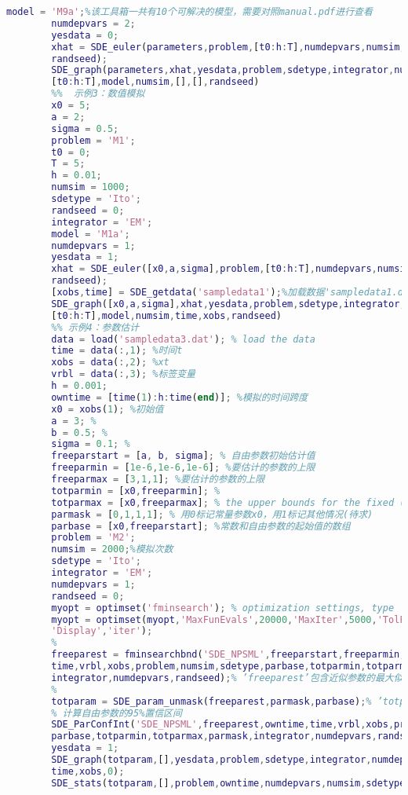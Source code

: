 \begin{lstlisting}[language= Matlab]
        model = 'M9a';%该工具箱一共有10个可解决的模型，需要对照manual.pdf进行查看
        numdepvars = 2;
        yesdata = 0;
        xhat = SDE_euler(parameters,problem,[t0:h:T],numdepvars,numsim,sdetype,...
        randseed);
        SDE_graph(parameters,xhat,yesdata,problem,sdetype,integrator,numdepvars,...
        [t0:h:T],model,numsim,[],[],randseed)
        %%  示例3：数值模拟
        x0 = 5;
        a = 2;
        sigma = 0.5;
        problem = 'M1';
        t0 = 0;
        T = 5;
        h = 0.01;
        numsim = 1000;
        sdetype = 'Ito';
        randseed = 0;
        integrator = 'EM';
        model = 'M1a';
        numdepvars = 1;
        yesdata = 1;
        xhat = SDE_euler([x0,a,sigma],problem,[t0:h:T],numdepvars,numsim,sdetype,...
        randseed);
        [xobs,time] = SDE_getdata('sampledata1');%加载数据'sampledata1.dat'
        SDE_graph([x0,a,sigma],xhat,yesdata,problem,sdetype,integrator,numdepvars,...
        [t0:h:T],model,numsim,time,xobs,randseed)
        %% 示例4：参数估计
        data = load('sampledata3.dat'); % load the data
        time = data(:,1); %时间t
        xobs = data(:,2); %xt
        vrbl = data(:,3); %标签变量
        h = 0.001;
        owntime = [time(1):h:time(end)]; %模拟的时间跨度
        x0 = xobs(1); %初始值
        a = 3; %
        b = 0.5; %
        sigma = 0.1; %
        freeparstart = [a, b, sigma]; % 自由参数初始估计值
        freeparmin = [1e-6,1e-6,1e-6]; %要估计的参数的上限
        freeparmax = [3,1,1]; %要估计的参数的上限
        totparmin = [x0,freeparmin]; %
        totparmax = [x0,freeparmax]; % the upper bounds for the fixed (x0) and the free to vary parameters
        parmask = [0,1,1,1]; % 用0标记常量参数x0，用1标记其他情况(待求)
        parbase = [x0,freeparstart]; %常数和自由参数的起始值的数组
        problem = 'M2';
        numsim = 2000;%模拟次数
        sdetype = 'Ito';
        integrator = 'EM';
        numdepvars = 1;
        randseed = 0;
        myopt = optimset('fminsearch'); % optimization settings, type ’help optimset’ for details
        myopt = optimset(myopt,'MaxFunEvals',20000,'MaxIter',5000,'TolFun',1.e-4,'TolX',1.e-4,...
        'Display','iter');
        %
        freeparest = fminsearchbnd('SDE_NPSML',freeparstart,freeparmin,freeparmax,myopt,owntime,...
        time,vrbl,xobs,problem,numsim,sdetype,parbase,totparmin,totparmax,parmask,...
        integrator,numdepvars,randseed);% ’freeparest’包含近似参数的最大似然估计
        %
        totparam = SDE_param_unmask(freeparest,parmask,parbase);% ’totparam’包含固定的数组和参数
        % 计算自由参数的95%置信区间
        SDE_ParConfInt('SDE_NPSML',freeparest,owntime,time,vrbl,xobs,problem,numsim,sdetype,...
        parbase,totparmin,totparmax,parmask,integrator,numdepvars,randseed);
        yesdata = 1;
        SDE_graph(totparam,[],yesdata,problem,sdetype,integrator,numdepvars,owntime,[],numsim,...
        time,xobs,0);
        SDE_stats(totparam,[],problem,owntime,numdepvars,numsim,sdetype,integrator,0);
        \end{lstlisting}






